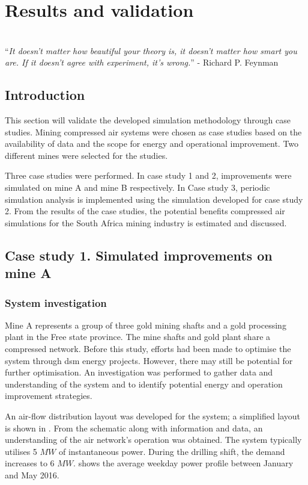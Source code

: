 \chapter{Results and validation}
\thispagestyle{empty}
\vspace{40em}
\hrulefill \\
\enquote{\textit{It doesn't matter how beautiful your theory is, it doesn't matter how smart you are. If it doesn't agree with experiment, it's wrong.}} - Richard P. Feynman\\
\newpage
\section{Introduction}
This section will validate the developed simulation methodology through case studies. Mining compressed air systems were chosen as case studies based on the availability of data and the scope for energy and operational improvement. Two different mines were selected for the studies. 
\par 
Three case studies were performed. In case study 1 and 2, improvements were simulated on mine A and mine B respectively. In Case study 3, periodic simulation analysis is implemented using the simulation developed for case study 2. From the results of the case studies, the potential benefits compressed air simulations for the South Africa mining industry is estimated and discussed.

\section{Case study 1. Simulated improvements on mine A}
\subsection{System investigation}
Mine A represents a group of three gold mining shafts and a gold processing plant in the Free state province. The mine shafts and gold plant share a compressed network. Before this study, efforts had been made to optimise the system through \gls{dsm} energy projects. However, there may still be potential for further optimisation. An investigation was performed to gather data and understanding of the system and to identify potential energy and operation improvement strategies.
\par 
An air-flow distribution layout was developed for the system; a simplified layout is shown in . From the schematic along with information and data, an understanding of the air network’s operation was obtained. The system typically utilises 5 $MW$ of instantaneous power. During the drilling shift, the demand increases to 6 $MW$.  shows the average weekday power profile between January and May 2016.


